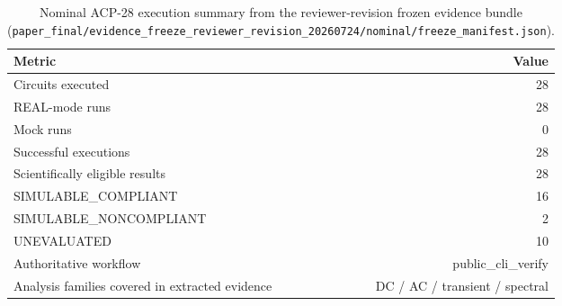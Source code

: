 \begin{table}[t]
\centering
\small
\caption{Nominal ACP-28 execution summary from the reviewer-revision frozen evidence bundle (\texttt{paper\_final/evidence\_freeze\_reviewer\_revision\_20260724/nominal/freeze\_manifest.json}).}
\label{tab:rq1_nominal_summary}
\begin{tabular}{lr}
\toprule
Metric & Value \\
\midrule
Circuits executed & 28 \\
REAL-mode runs & 28 \\
Mock runs & 0 \\
Successful executions & 28 \\
Scientifically eligible results & 28 \\
SIMULABLE\_COMPLIANT & 16 \\
SIMULABLE\_NONCOMPLIANT & 2 \\
UNEVALUATED & 10 \\
Authoritative workflow & public\_cli\_verify \\
Analysis families covered in extracted evidence & DC / AC / transient / spectral \\
\bottomrule
\end{tabular}
\end{table}

\begin{table}[t]
\centering
\scriptsize
\caption{Compact nominal outcome table from the reviewer-revision frozen public replay. The full per-circuit table remains available in \texttt{paper\_final/evidence\_freeze\_reviewer\_revision\_20260724/nominal/nominal\_summary.csv}.}
\label{tab:rq2_nominal_compact}
\end{table}

